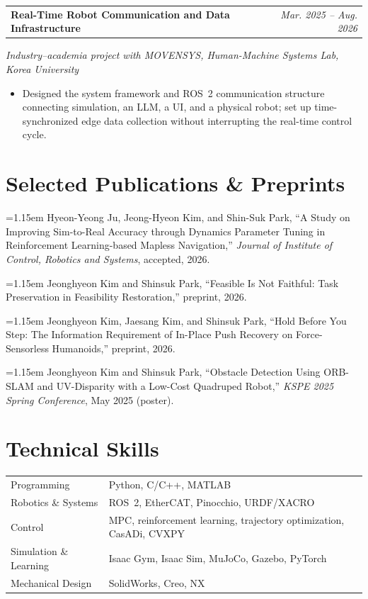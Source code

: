 \documentclass[a4paper,11pt]{article}
\makeatletter
\newcommand{\researchentry}[2]{%
  \begin{tabularx}{\textwidth}{@{}Xr@{}}
    \textbf{#1} & \textit{#2}
  \end{tabularx}\vspace{-0.5ex}
}
\newcommand{\compactlist}{%
  \begin{itemize}[leftmargin=1.3em,itemsep=0.12ex,topsep=0.22ex,parsep=0pt,partopsep=0pt]
}
\newcommand{\finishcompactlist}{\end{itemize}\vspace{0.28ex}}
\newcommand{\pubentry}[1]{%
  \par\hangindent=1.15em\hangafter=1 #1\par\vspace{0.25ex}
}
\makeatother
\begin{document}
\researchentry{Real-Time Robot Communication and Data Infrastructure}{Mar. 2025 -- Aug. 2026}
{\small\textit{Industry--academia project with MOVENSYS, Human-Machine Systems Lab, Korea University}}
\compactlist
  \item Designed the system framework and ROS~2 communication structure connecting simulation, an LLM, a UI, and a physical robot; set up time-synchronized edge data collection without interrupting the real-time control cycle.
\finishcompactlist

\section{Selected Publications \& Preprints}

\pubentry{Hyeon-Yeong Ju, Jeong-Hyeon Kim, and Shin-Suk Park, ``A Study on Improving Sim-to-Real Accuracy through Dynamics Parameter Tuning in Reinforcement Learning-based Mapless Navigation,'' \textit{Journal of Institute of Control, Robotics and Systems}, accepted, 2026.}
\pubentry{Jeonghyeon Kim and Shinsuk Park, ``Feasible Is Not Faithful: Task Preservation in Feasibility Restoration,'' preprint, 2026.}
\pubentry{Jeonghyeon Kim, Jaesang Kim, and Shinsuk Park, ``Hold Before You Step: The Information Requirement of In-Place Push Recovery on Force-Sensorless Humanoids,'' preprint, 2026.}
\pubentry{Jeonghyeon Kim and Shinsuk Park, ``Obstacle Detection Using ORB-SLAM and UV-Disparity with a Low-Cost Quadruped Robot,'' \textit{KSPE 2025 Spring Conference}, May 2025 (poster).}

\section{Technical Skills}

\begin{tabularx}{\textwidth}{@{}l X@{}}
Programming & Python, C/C++, MATLAB \\
Robotics \& Systems & ROS~2, EtherCAT, Pinocchio, URDF/XACRO \\
Control & MPC, reinforcement learning, trajectory optimization, CasADi, CVXPY \\
Simulation \& Learning & Isaac Gym, Isaac Sim, MuJoCo, Gazebo, PyTorch \\
Mechanical Design & SolidWorks, Creo, NX
\end{tabularx}
\end{document}
